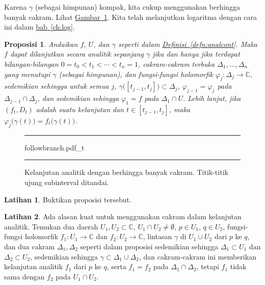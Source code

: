 \documentclass[12pt,openany]{book}
\newcommand{\C}{{\mathbb{C}}}
\theoremstyle{plain}
\newtheorem{prop}[thm]{Proposisi}
\theoremstyle{remark}
\theoremstyle{definition}
\newenvironment{exbox}{%
    \def\FrameCommand{\vrule width 1pt \relax\hspace{10pt}}%
    \MakeFramed{\advance\hsize-\width\FrameRestore}%
}{%
    \endMakeFramed
}
\newenvironment{myfig}{%
\begin{figure}[h!t]
\noindent\rule{\textwidth}{0.5pt}\vspace{12pt}\par\centering}%
{\par\noindent\rule{\textwidth}{0.5pt}
\end{figure}}
\theoremstyle{exercise}
\newtheorem{exercise}{Latihan}[section]
\theoremstyle{example}
\newcommand{\figureref}[1]{\hyperref[#1]{Gambar~\ref*{#1}}}
\newcommand{\chapterref}[1]{\hyperref[#1]{bab~\ref*{#1}}}
\newcommand{\defnref}[1]{\hyperref[#1]{Definisi~\ref*{#1}}}
\begin{document}
Karena $\gamma$ (sebagai himpunan) kompak, kita cukup menggunakan berhingga banyak
cakram.  Lihat \figureref{fig:followbranch2}.
Kita telah melanjutkan logaritma dengan cara ini dalam
\chapterref{ch:log}.

\begin{prop} \label{prop:finitedisccont}
Andaikan $f$, $U$, dan $\gamma$ seperti dalam \defnref{defn:analcont}.
Maka
$f$ dapat dilanjutkan secara analitik sepanjang $\gamma$
jika dan hanya jika terdapat bilangan-bilangan $0 = t_0 < t_1 < \cdots < t_n = 1$,
cakram-cakram terbuka
$\Delta_1,\ldots,\Delta_n$ yang menutupi $\gamma$ (sebagai himpunan),
dan fungsi-fungsi holomorfik $\varphi_j \colon \Delta_j \to \C$,
sedemikian sehingga untuk semua $j$, $\gamma\bigl([t_{j-1},t_j]\bigr) \subset \Delta_j$,
$\varphi_{j-1} = \varphi_j$ pada $\Delta_{j-1} \cap \Delta_j$,
dan sedemikian sehingga $\varphi_1 = f$ pada $\Delta_1 \cap U$.
Lebih lanjut, jika $(f_t,D_t)$ adalah suatu kelanjutan dan $t \in [t_{j-1},t_j]$,
maka $\varphi_j\bigl(\gamma(t)\bigr) = f_t\bigl(\gamma(t)\bigr)$.
\end{prop}

\begin{myfig}
{followbranch.pdf_t}
\caption{Kelanjutan analitik dengan berhingga banyak cakram.  Titik-titik ujung
subinterval ditandai.\label{fig:followbranch2}}
\end{myfig}

\begin{exbox}
\begin{exercise}
Buktikan proposisi tersebut.
\end{exercise}

\begin{exercise}
Ada alasan kuat untuk menggunakan cakram dalam kelanjutan analitik.  Temukan dua daerah
$U_1, U_2 \subset \C$, $U_1 \cap U_2 \neq \emptyset$,
$p \in U_1$, $q \in U_2$, fungsi-fungsi holomorfik
$f_1 \colon U_1 \to \C$ dan $f_2 \colon U_2 \to \C$,
lintasan $\gamma$ di $U_1 \cup U_2$ dari $p$ ke $q$, dan dua cakram $\Delta_1,\Delta_2$
seperti dalam proposisi sedemikian sehingga $\Delta_1 \subset U_1$ dan $\Delta_2 \subset
U_2$, sedemikian sehingga $\gamma \subset \Delta_1 \cup \Delta_2$, dan cakram-cakram ini
memberikan kelanjutan analitik $f_1$ dari $p$ ke $q$, serta $f_1 =
f_2$ pada $\Delta_1 \cap \Delta_2$, tetapi $f_1$ tidak sama dengan $f_2$
pada $U_1 \cap U_2$.
\end{exercise}
\end{exbox}
\end{document}
